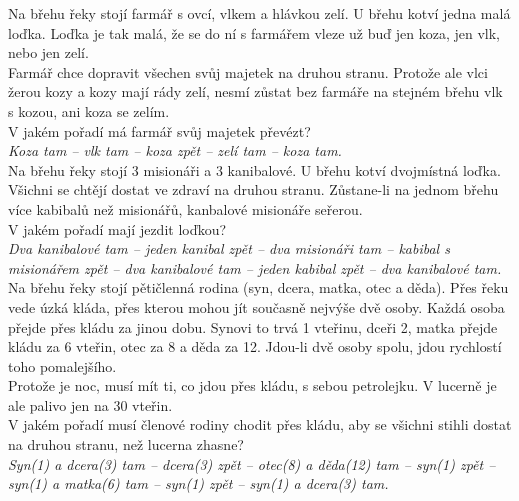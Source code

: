 \begin{multicols}{2}
\noindent
Na břehu řeky stojí farmář s ovcí, vlkem a hlávkou zelí. U břehu kotví jedna
malá loďka. Loďka je tak malá, že se do ní s farmářem vleze už buď jen koza,
jen vlk, nebo jen zelí.\\
Farmář chce dopravit všechen svůj majetek na druhou stranu. Protože ale vlci
žerou kozy a kozy mají rády zelí, nesmí zůstat bez farmáře na stejném břehu
vlk s kozou, ani koza se zelím.\\
V jakém pořadí má farmář svůj majetek převézt?\\[1 mm]
{\sl Koza tam -- vlk tam -- koza zpět -- zelí tam -- koza tam.}\\

\noindent
Na břehu řeky stojí 3 misionáři a 3 kanibalové. U břehu kotví dvojmístná
loďka. Všichni se chtějí dostat ve zdraví na druhou stranu. Zůstane-li na
jednom břehu více kabibalů než misionářů, kanbalové misionáře seřerou.\\
V jakém pořadí mají jezdit loďkou?\\[1 mm]
{\sl Dva kanibalové tam -- jeden kanibal zpět -- dva misionáři tam -- 
kabibal s misionářem zpět -- dva kanibalové tam -- jeden kabibal zpět --
dva kanibalové tam.}\\

\noindent
Na břehu řeky stojí pětičlenná rodina (syn, dcera, matka, otec a děda).
Přes řeku vede úzká kláda, přes kterou mohou jít současně nejvýše dvě osoby.
Každá osoba přejde přes kládu za jinou dobu. Synovi to trvá 1 vteřinu, dceři
2, matka přejde kládu za 6 vteřin, otec za 8 a děda za 12. Jdou-li dvě osoby
spolu, jdou rychlostí toho pomalejšího.\\
Protože je noc, musí mít ti, co jdou přes kládu, s sebou petrolejku. V lucerně
je ale palivo jen na 30 vteřin.\\
V jakém pořadí musí členové rodiny chodit přes kládu, aby se všichni stihli
dostat na druhou stranu, než lucerna zhasne?\\[1 mm]
{\sl Syn(1) a dcera(3) tam -- dcera(3) zpět -- otec(8) a děda(12) tam -- 
syn(1) zpět -- syn(1) a matka(6) tam -- syn(1) zpět -- syn(1) a dcera(3)
tam.}\\


\end{multicols}
